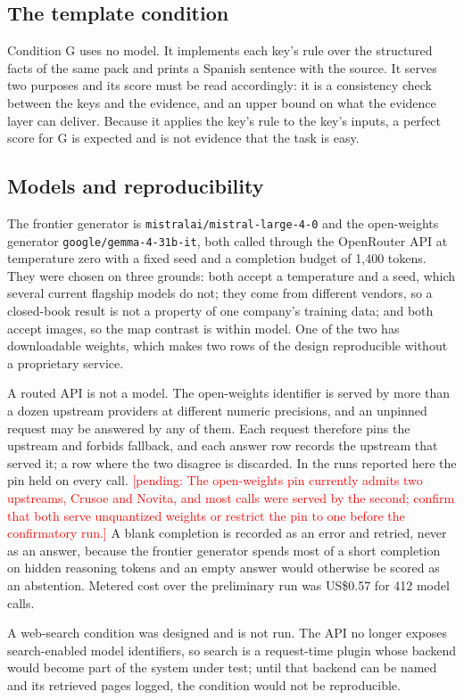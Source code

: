 \documentclass[11pt,a4paper]{article}
\newcommand{\pending}[1]{\textcolor{red}{[pending: #1]}}
\begin{document}
\subsection{The template condition}
Condition G uses no model. It implements each key's rule over the structured facts of
the same pack and prints a Spanish sentence with the source. It serves two purposes
and its score must be read accordingly: it is a consistency check between the keys
and the evidence, and an upper bound on what the evidence layer can deliver. Because
it applies the key's rule to the key's inputs, a perfect score for G is expected and
is not evidence that the task is easy.

\subsection{Models and reproducibility}
The frontier generator is \texttt{mistralai/mistral-large-4-0} and the open-weights
generator \texttt{google/gemma-4-31b-it}, both called through the OpenRouter API at
temperature zero with a fixed seed and a completion budget of 1{,}400 tokens. They
were chosen on three grounds: both accept a temperature and a seed, which several
current flagship models do not; they come from different vendors, so a closed-book
result is not a property of one company's training data; and both accept images, so
the map contrast is within model. One of the two has downloadable weights, which
makes two rows of the design reproducible without a proprietary service.

A routed API is not a model. The open-weights identifier is served by more than a
dozen upstream providers at different numeric precisions, and an unpinned request may
be answered by any of them. Each request therefore pins the upstream and forbids
fallback, and each answer row records the upstream that served it; a row where the
two disagree is discarded. In the runs reported here the pin held on every call.
\pending{The open-weights pin currently admits two upstreams, Crusoe and Novita, and
most calls were served by the second; confirm that both serve unquantized weights or
restrict the pin to one before the confirmatory run.} A blank completion is recorded
as an error and retried, never as an answer, because the frontier generator spends
most of a short completion on hidden reasoning tokens and an empty answer would
otherwise be scored as an abstention. Metered cost over the preliminary run was
US\$0.57 for 412 model calls.

A web-search condition was designed and is not run. The API no longer exposes
search-enabled model identifiers, so search is a request-time plugin whose backend
would become part of the system under test; until that backend can be named and its
retrieved pages logged, the condition would not be reproducible.
\end{document}
